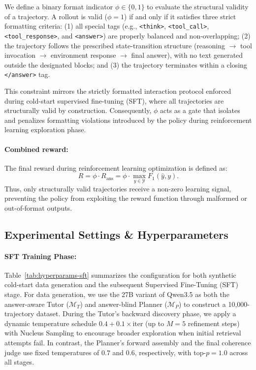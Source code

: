 \documentclass{article} %
\begin{document}
We define a binary format indicator $\phi \in \{0,1\}$ to evaluate the structural validity of a trajectory. A rollout is valid ($\phi=1$) if and only if it satisfies three strict formatting criteria:
(1) all special tags (e.g., \texttt{<think>}, \texttt{<tool\_call>}, \texttt{<tool\_response>}, and \texttt{<answer>}) are properly balanced and non-overlapping;
(2) the trajectory follows the prescribed state-transition structure (reasoning $\rightarrow$ tool invocation $\rightarrow$ environment response $\rightarrow$ final answer), with no text generated outside the designated blocks; and
(3) the trajectory terminates within a closing \texttt{</answer>} tag.

This constraint mirrors the strictly formatted interaction protocol enforced during cold-start supervised fine-tuning (SFT), where all trajectories are structurally valid by construction. Consequently, $\phi$ acts as a gate that isolates and penalizes formatting violations introduced by the policy during reinforcement learning exploration phase.



\paragraph{Combined reward:}

The final reward during reinforcement learning optimization is defined as:
\begin{equation}
R = \phi \cdot R_{\mathrm{ans}}
  = \phi \cdot \max_{y \in \mathcal{Y}} F_1(\hat{y}, y).
\end{equation}
Thus, only structurally valid trajectories receive a non-zero learning signal, preventing the policy from exploiting the reward function through malformed or out-of-format outputs.


\subsection{Experimental Settings \& Hyperparameters}
\label{app:experimental-setting}



\paragraph{SFT Training Phase:} 

Table~\ref{tab:hyperparams-sft} summarizes the configuration for both synthetic cold-start data generation and the subsequent Supervised Fine-Tuning (SFT) stage. For data generation, we use the 27B variant of Qwen3.5 as both the answer-aware Tutor ($\mathcal{M}_T$) and answer-blind Planner ($\mathcal{M}_P$) to construct a 10,000-trajectory dataset. During the Tutor’s backward discovery phase, we apply a dynamic temperature schedule $0.4 + 0.1 \times \text{iter}$ (up to $M=5$ refinement steps) with Nucleus Sampling \citep{Holtzman2020The} to encourage broader exploration when initial retrieval attempts fail. In contrast, the Planner’s forward assembly and the final coherence judge use fixed temperatures of $0.7$ and $0.6$, respectively, with top-$p=1.0$ across all stages.
\end{document}
